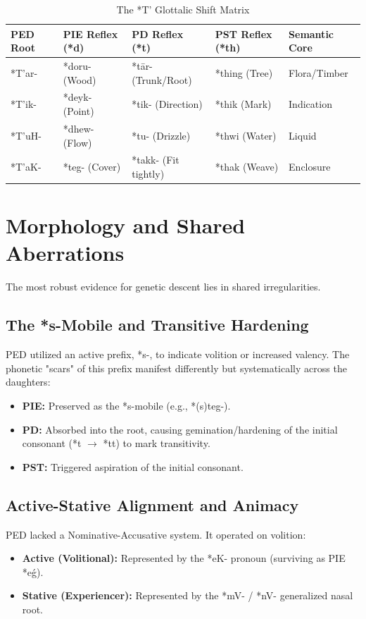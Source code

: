 \documentclass[11pt,a4paper]{article}
\begin{document}
\begin{table}[h]
\centering
\begin{tabular}{@{}lllll@{}}
\toprule
\textbf{PED Root} & \textbf{PIE Reflex (*d)} & \textbf{PD Reflex (*t)} & \textbf{PST Reflex (*th)} & \textbf{Semantic Core} \\ \midrule
*T'ar- & *doru- (Wood) & *tār- (Trunk/Root) & *thing (Tree) & Flora/Timber \\
*T'ik- & *deyk- (Point) & *tik- (Direction) & *thik (Mark) & Indication \\
*T'uH- & *dhew- (Flow) & *tu- (Drizzle) & *thwi (Water) & Liquid \\
*T'aK- & *teg- (Cover) & *takk- (Fit tightly) & *thak (Weave) & Enclosure \\ \bottomrule
\end{tabular}
\caption{The *T' Glottalic Shift Matrix}
\end{table}

\section{Morphology and Shared Aberrations}
The most robust evidence for genetic descent lies in shared irregularities.

\subsection{The *s-Mobile and Transitive Hardening}
PED utilized an active prefix, *s-, to indicate volition or increased valency. The phonetic "scars" of this prefix manifest differently but systematically across the daughters:
\begin{itemize}
    \item \textbf{PIE:} Preserved as the *s-mobile (e.g., *(s)teg-).
    \item \textbf{PD:} Absorbed into the root, causing gemination/hardening of the initial consonant (*t $\rightarrow$ *tt) to mark transitivity.
    \item \textbf{PST:} Triggered aspiration of the initial consonant.
\end{itemize}

\subsection{Active-Stative Alignment and Animacy}
PED lacked a Nominative-Accusative system. It operated on volition:
\begin{itemize}
    \item \textbf{Active (Volitional):} Represented by the *eK- pronoun (surviving as PIE *eǵ).
    \item \textbf{Stative (Experiencer):} Represented by the *mV- / *nV- generalized nasal root.
\end{itemize}
\end{document}
